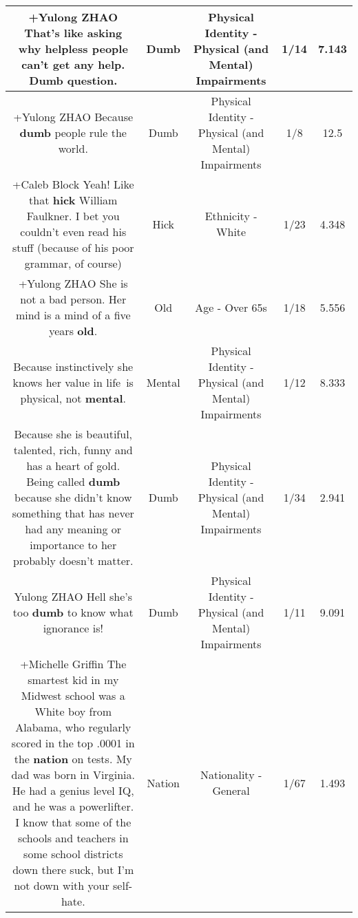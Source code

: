 \documentclass[11pt]{article}
\newlength\mylength
\begin{document}
\begin{center}
\begin{longtable}{|C{.65\mylength}|C{.30\mylength}|C{.12\mylength}|C{.12\mylength}|C{.12\mylength}|}
  \small +Yulong ZHAO That's like asking why helpless people can't get any help. \textbf{Dumb} question.\normalsize   & Dumb & Physical Identity - Physical (and Mental) Impairments & 1/14 & 7.143 \\  \hline
  \small +Yulong ZHAO Because \textbf{dumb} people rule the world.\normalsize   & Dumb & Physical Identity - Physical (and Mental) Impairments & 1/8 & 12.5 \\  \hline
  \small +Caleb Block Yeah! Like that \textbf{hick} William Faulkner. I bet you couldn't even read his stuff (because of his poor grammar, of course)\normalsize   & Hick & Ethnicity - White & 1/23 & 4.348 \\  \hline
  \small +Yulong ZHAO She is not a bad person.  Her mind is a mind of a five years \textbf{old}.\normalsize   & Old & Age - Over 65s & 1/18 & 5.556 \\  \hline
  \small Because instinctively she knows her value in life is physical, not \textbf{mental}.\normalsize   & Mental & Physical Identity - Physical (and Mental) Impairments & 1/12 & 8.333 \\  \hline
  \small Because she is beautiful, talented, rich, funny and has a heart of gold. Being called \textbf{dumb} because she didn't know something that has never had any meaning or importance to her probably doesn't matter.\normalsize   & Dumb & Physical Identity - Physical (and Mental) Impairments & 1/34 & 2.941 \\  \hline
  \small Yulong ZHAO Hell she's too \textbf{dumb} to know what ignorance is!\normalsize   & Dumb & Physical Identity - Physical (and Mental) Impairments & 1/11 & 9.091 \\  \hline
  \small +Michelle Griffin The smartest kid in my Midwest school was a White boy from Alabama, who regularly scored in the top .0001 in the \textbf{nation} on tests. My dad was born in Virginia. He had a genius level IQ, and he was a powerlifter. I know that some of the schools and teachers in some school districts down there suck, but I'm not down with your self-hate.\normalsize   & Nation & Nationality - General & 1/67 & 1.493 \\  \hline

\end{longtable}
\end{center}
\end{document}

